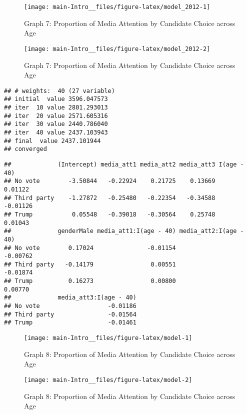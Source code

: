 \documentclass[11pt,]{article}
\begin{document}
\begin{figure}

{\centering \texttt{[image: main-Intro\_\_files/figure-latex/model\_2012-1]} 

}

\caption{Graph 7: Proportion of Media Attention by Candidate Choice across Age}\label{fig:model_20121}
\end{figure}\begin{figure}

{\centering \texttt{[image: main-Intro\_\_files/figure-latex/model\_2012-2]} 

}

\caption{Graph 7: Proportion of Media Attention by Candidate Choice across Age}\label{fig:model_20122}
\end{figure}

\begin{verbatim}
## # weights:  40 (27 variable)
## initial  value 3596.047573 
## iter  10 value 2801.293013
## iter  20 value 2571.605316
## iter  30 value 2440.786040
## iter  40 value 2437.103943
## final  value 2437.101944 
## converged
\end{verbatim}

\begin{verbatim}
##             (Intercept) media_att1 media_att2 media_att3 I(age - 40)
## No vote        -3.50844   -0.22924    0.21725    0.13669     0.01122
## Third party    -1.27872   -0.25480   -0.22354   -0.34588    -0.01126
## Trump           0.05548   -0.39018   -0.30564    0.25748     0.01043
##             genderMale media_att1:I(age - 40) media_att2:I(age - 40)
## No vote        0.17024               -0.01154               -0.00762
## Third party   -0.14179                0.00551               -0.01874
## Trump          0.16273                0.00800                0.00770
##             media_att3:I(age - 40)
## No vote                   -0.01186
## Third party               -0.01564
## Trump                     -0.01461
\end{verbatim}

\begin{figure}

{\centering \texttt{[image: main-Intro\_\_files/figure-latex/model-1]} 

}

\caption{Graph 8: Proportion of Media Attention by Candidate Choice across Age}\label{fig:model1}
\end{figure}\begin{figure}

{\centering \texttt{[image: main-Intro\_\_files/figure-latex/model-2]} 

}

\caption{Graph 8: Proportion of Media Attention by Candidate Choice across Age}\label{fig:model2}
\end{figure}
\end{document}
